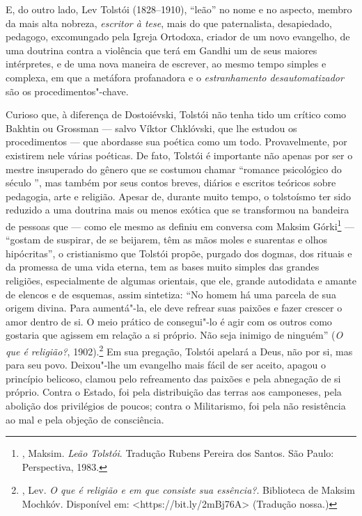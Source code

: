 E, do outro lado, Lev Tolstói (1828--1910), ``leão'' no nome e
no aspecto, membro da mais alta nobreza, \emph{escritor à tese},
mais do que paternalista, desapiedado, pedagogo, excomungado pela
Igreja Ortodoxa, criador de um novo evangelho, de uma doutrina
contra a violência que terá em Gandhi um de seus maiores
intérpretes, e de uma nova maneira de escrever, ao mesmo
tempo simples e complexa, em que a metáfora profanadora e o
\emph{estranhamento desautomatizador} são os procedimentos"-chave.

Curioso que, à diferença de Dostoiévski, Tolstói não tenha tido
um crítico como Bakhtin ou Grossman --- salvo Víktor Chklóvski, que lhe estudou os procedimentos --- que abordasse sua poética
como um todo. Provavelmente, por existirem nele várias poéticas.
De fato, Tolstói é importante não apenas por ser o mestre
insuperado do gênero que se costumou chamar ``romance psicológico
do século '', mas também por seus contos breves,
diários e escritos teóricos sobre pedagogia, arte e religião.
Apesar de, durante muito tempo, o tolstoísmo ter sido reduzido
a uma doutrina mais ou menos exótica que se transformou na
bandeira de pessoas que --- como ele mesmo as definiu em conversa
com Maksim Górki\footnote{, Maksim. \emph{Leão
Tolstói}. Tradução Rubens Pereira dos Santos. São Paulo:
Perspectiva, 1983.} --- ``gostam de suspirar, de se beijarem,
têm as mãos moles e suarentas e olhos hipócritas'', o
cristianismo que Tolstói propõe, purgado dos dogmas, dos
rituais e da promessa de uma vida eterna, tem as bases muito
simples das grandes religiões, especialmente de algumas orientais,
que ele, grande autodidata e amante de elencos e de esquemas,
assim sintetiza: ``No homem há uma parcela de sua origem divina.
Para aumentá"-la, ele deve refrear suas paixões e fazer crescer o
amor dentro de si. O meio prático de consegui"-lo é agir com os
outros como gostaria que agissem em relação a si próprio. Não
seja inimigo de ninguém'' (\emph{O que é religião?},
1902).\footnote{, Lev. \emph{O que é religião e em que consiste sua essência?}. Biblioteca de Maksim Mochkóv.
Disponível em: \textless{}https://bit.ly/2mBj76A\textgreater{}
(Tradução nossa.)} Em sua pregação, Tolstói apelará a Deus, não por si, mas
para seu povo. Deixou"-lhe um evangelho mais fácil de ser aceito, apagou
o princípio belicoso, clamou pelo refreamento das paixões e pela
abnegação de si próprio. Contra o Estado, foi pela distribuição
das terras aos camponeses, pela abolição dos privilégios de
poucos; contra o Militarismo, foi pela não resistência ao mal e
pela objeção de consciência.

